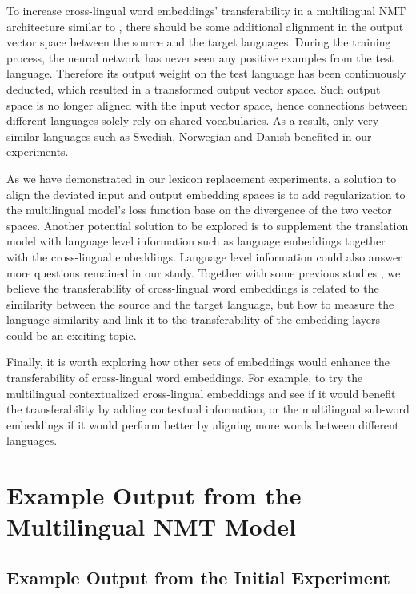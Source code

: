 \documentclass[thesis,fonts=libertine]{cluu}
\begin{document}
To increase cross-lingual word embeddings' transferability in a multilingual NMT architecture similar to \textcite{Johnson:2016aa}, there should be some additional alignment in the output vector space between the source and the target languages. During the training process, the neural network has never seen any positive examples from the test language. Therefore its output weight on the test language has been continuously deducted, which resulted in a transformed output vector space. Such output space is no longer aligned with the input vector space, hence connections between different languages solely rely on shared vocabularies. As a result, only very similar languages such as Swedish, Norwegian and Danish benefited in our experiments.

As we have demonstrated in our lexicon replacement experiments, a solution to align the deviated input and output embedding spaces is to add regularization to the multilingual model's loss function base on the divergence of the two vector spaces. Another potential solution to be explored is to supplement the translation model with language level information such as language embeddings \parencite{littell-etal-2017-uriel,malaviya-etal-2017-learning} together with the cross-lingual embeddings. Language level information could also answer more questions remained in our study. Together with some previous studies \parencite{Qi:2018aa,aji-etal-2020-neural}, we believe the transferability of cross-lingual word embeddings is related to the similarity between the source and the target language, but how to measure the language similarity and link it to the transferability of the embedding layers could be an exciting topic.

Finally, it is worth exploring how other sets of embeddings would enhance the transferability of cross-lingual word embeddings. For example, to try the multilingual contextualized cross-lingual embeddings \textcite{devlin-etal-2019-bert} and see if it would benefit the transferability by adding contextual information, or the multilingual sub-word embeddings \textcite{Heinzerling:2017aa} if it would perform better by aligning more words between different languages.

\appendix
\chapter{Example Output from the Multilingual NMT Model}
\label{chap:example_output}

\section{Example Output from the Initial Experiment}
\label{sec:initial_output}
\end{document}
